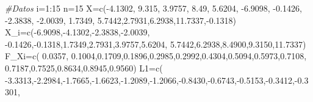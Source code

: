\documentclass[
  a4paper,
  oneside,
  openany]{book}
\newenvironment{Shaded}{\begin{snugshade}}{\end{snugshade}}
\newcommand{\CommentTok}[1]{\textcolor[rgb]{0.56,0.35,0.01}{\textit{#1}}}
\newcommand{\DecValTok}[1]{\textcolor[rgb]{0.00,0.00,0.81}{#1}}
\newcommand{\FloatTok}[1]{\textcolor[rgb]{0.00,0.00,0.81}{#1}}
\newcommand{\FunctionTok}[1]{\textcolor[rgb]{0.00,0.00,0.00}{#1}}
\newcommand{\NormalTok}[1]{#1}
\newcommand{\OtherTok}[1]{\textcolor[rgb]{0.56,0.35,0.01}{#1}}
\newcommand{\SpecialCharTok}[1]{\textcolor[rgb]{0.00,0.00,0.00}{#1}}
\begin{document}
\begin{Shaded}
\begin{Highlighting}[]
\CommentTok{\#Datos}
\NormalTok{i}\OtherTok{=}\DecValTok{1}\SpecialCharTok{:}\DecValTok{15}
\NormalTok{n}\OtherTok{=}\DecValTok{15}
\NormalTok{X}\OtherTok{=}\FunctionTok{c}\NormalTok{(}\SpecialCharTok{{-}}\FloatTok{4.1302}\NormalTok{, }\FloatTok{9.315}\NormalTok{, }\FloatTok{3.9757}\NormalTok{, }\FloatTok{8.49}\NormalTok{, }\FloatTok{5.6204}\NormalTok{, }\SpecialCharTok{{-}}\FloatTok{6.9098}\NormalTok{, }\SpecialCharTok{{-}}\FloatTok{0.1426}\NormalTok{, }\SpecialCharTok{{-}}\FloatTok{2.3838}\NormalTok{,}
                            \SpecialCharTok{{-}}\FloatTok{2.0039}\NormalTok{, }\FloatTok{1.7349}\NormalTok{, }\FloatTok{5.7442}\NormalTok{,}\FloatTok{2.7931}\NormalTok{,}\FloatTok{6.2938}\NormalTok{,}\FloatTok{11.7337}\NormalTok{,}\SpecialCharTok{{-}}\FloatTok{0.1318}\NormalTok{)}
\NormalTok{X\_i}\OtherTok{=}\FunctionTok{c}\NormalTok{(}\SpecialCharTok{{-}}\FloatTok{6.9098}\NormalTok{,}\SpecialCharTok{{-}}\FloatTok{4.1302}\NormalTok{,}\SpecialCharTok{{-}}\FloatTok{2.3838}\NormalTok{,}\SpecialCharTok{{-}}\FloatTok{2.0039}\NormalTok{, }\SpecialCharTok{{-}}\FloatTok{0.1426}\NormalTok{,}\SpecialCharTok{{-}}\FloatTok{0.1318}\NormalTok{,}\FloatTok{1.7349}\NormalTok{,}\FloatTok{2.7931}\NormalTok{,}\FloatTok{3.9757}\NormalTok{,}\FloatTok{5.6204}\NormalTok{,}
      \FloatTok{5.7442}\NormalTok{,}\FloatTok{6.2938}\NormalTok{,}\FloatTok{8.4900}\NormalTok{,}\FloatTok{9.3150}\NormalTok{,}\FloatTok{11.7337}\NormalTok{)}
\NormalTok{F\_Xi}\OtherTok{=}\FunctionTok{c}\NormalTok{( }\FloatTok{0.0357}\NormalTok{, }\FloatTok{0.1004}\NormalTok{,}\FloatTok{0.1709}\NormalTok{,}\FloatTok{0.1896}\NormalTok{,}\FloatTok{0.2985}\NormalTok{,}\FloatTok{0.2992}\NormalTok{,}\FloatTok{0.4304}\NormalTok{,}\FloatTok{0.5094}\NormalTok{,}\FloatTok{0.5973}\NormalTok{,}\FloatTok{0.7108}\NormalTok{,}
        \FloatTok{0.7187}\NormalTok{,}\FloatTok{0.7525}\NormalTok{,}\FloatTok{0.8634}\NormalTok{,}\FloatTok{0.8945}\NormalTok{,}\FloatTok{0.9560}\NormalTok{)}
\NormalTok{L1}\OtherTok{=}\FunctionTok{c}\NormalTok{( }\SpecialCharTok{{-}}\FloatTok{3.3313}\NormalTok{,}\SpecialCharTok{{-}}\FloatTok{2.2984}\NormalTok{,}\SpecialCharTok{{-}}\FloatTok{1.7665}\NormalTok{,}\SpecialCharTok{{-}}\FloatTok{1.6623}\NormalTok{,}\SpecialCharTok{{-}}\FloatTok{1.2089}\NormalTok{,}\SpecialCharTok{{-}}\FloatTok{1.2066}\NormalTok{,}\SpecialCharTok{{-}}\FloatTok{0.8430}\NormalTok{,}\SpecialCharTok{{-}}\FloatTok{0.6743}\NormalTok{,}\SpecialCharTok{{-}}\FloatTok{0.5153}\NormalTok{,}\SpecialCharTok{{-}}\FloatTok{0.3412}\NormalTok{,}\SpecialCharTok{{-}}\FloatTok{0.3301}\NormalTok{,}

\end{Highlighting}
\end{Shaded}
\end{document}
